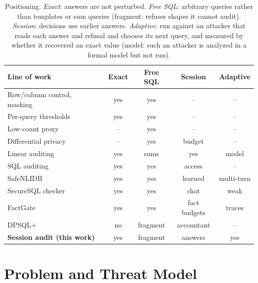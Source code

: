 \documentclass[sigconf,nonacm]{acmart}
\begin{document}
\begin{table}[!t]
\caption{Positioning. \emph{Exact}: answers are not perturbed. \emph{Free SQL}: arbitrary queries rather than templates or sum queries (fragment: refuses shapes it cannot audit). \emph{Session}: decisions use earlier answers. \emph{Adaptive}: run against an attacker that reads each answer and refusal and chooses its next query, and measured by whether it recovered an exact value (model: such an attacker is analyzed in a formal model but not run).}
\label{tab:positioning}
\centering\scriptsize
\setlength{\tabcolsep}{2.5pt}
\begin{tabular}{@{}lcccc@{}}
\toprule
Line of work & Exact & Free SQL & Session & Adaptive\\
\midrule
Row/column control, masking~\cite{rizvi2004extending,oracledeepsec,msddm} & yes & yes & -- & --\\
Per-query thresholds~\cite{snowflakeagg,bigqueryrules,awsminagg} & yes & yes & -- & --\\
Low-count proxy~\cite{francis2017diffix} & -- & yes & -- & --\\
Differential privacy~\cite{dwork2006calibrating,johnson2018flex,bigqueryrules} & -- & yes & budget & --\\
Linear auditing~\cite{chin1982auditing,kenthapadi2005simulatable,nabar2006robustness} & yes & sums & yes & model\\
SQL auditing~\cite{motwani2008auditing,kaushik2011auditing} & yes & yes & access & --\\
SafeNLIDB~\cite{liu2026safenlidb} & yes & yes & learned & multi-turn\\
SecureSQL checker~\cite{song2024securesql} & yes & yes & chat & weak\\
FactGate~\cite{wu2026factgate} & yes & yes & fact budgets & traces\\
DPSQL+~\cite{matsumoto2026dpsql} & no & fragment & accountant & --\\
\textbf{Session audit (this work)} & yes & fragment & answers & yes\\
\bottomrule
\end{tabular}
\end{table}

\section{Problem and Threat Model}\label{sec:form}
\end{document}
